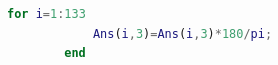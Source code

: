 \documentclass[withoutpreface,bwprint]{cumcmthesis} %
\begin{document}
\begin{appendices}
\begin{lstlisting}[language=matlab]
        for i=1:133
            Ans(i,3)=Ans(i,3)*180/pi;
        end
     \end{lstlisting}
\end{appendices}
\end{document}
